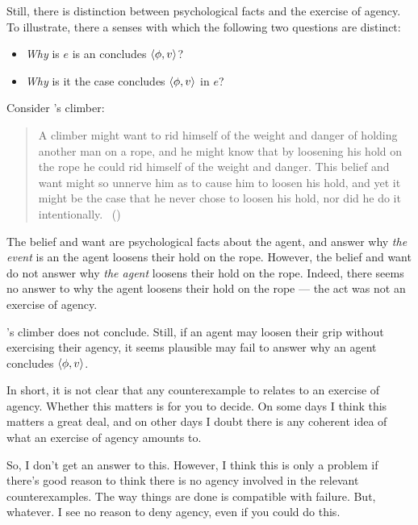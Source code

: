 \begin{note}
  Still, there is distinction between psychological facts and the exercise of agency.
  To illustrate, there a senses with which the following two questions are distinct:

  \begin{itemize}
  \item
    \emph{Why} is \(e\) is an  \vAgent{} concludes \(\langle\phi, v\rangle\)?
  \item
    \emph{Why} is it the case \vAgent{} concludes \(\langle\phi, v\rangle\) in \(e\)?
  \end{itemize}
  Consider \citeauthor{Davidson:1973vd}'s climber:
  \begin{quote}
    A climber might want to rid himself of the weight and danger of holding another man on a rope, and he might know that by loosening his hold on the rope he could rid himself of the weight and danger.
    This belief and want might so unnerve him as to cause him to loosen his hold, and yet it might be the case that he never chose to loosen his hold, nor did he do it intentionally.%
    \mbox{ }\hfill\mbox{(\citeyear[79]{Davidson:1973vd})}
  \end{quote}
  The \agents{} belief and want are psychological facts about the agent, and answer why \emph{the event} is an  the agent loosens their hold on the rope.
  However, the \agents{} belief and want do not answer why \emph{the agent} loosens their hold on the rope.
  Indeed, there seems no answer to why the agent loosens their hold on the rope --- the act was not an exercise of agency.

  \citeauthor{Davidson:1973vd}'s climber does not conclude.
  Still, if an agent may loosen their grip without exercising their agency, it seems plausible  may fail to answer why  an agent concludes \(\langle\phi, v\rangle\).

  In short, it is not clear that any counterexample to \issueInclusion{} relates to an exercise of agency.
  Whether this matters is for you to decide.
  On some days I think this matters a great deal, and on other days I doubt there is any coherent idea of what an exercise of agency amounts to.
\end{note}


\begin{note}
  \color{red}
  So, I don't get an answer to this.
  However, I think this is only a problem if there's good reason to think there is no agency involved in the relevant counterexamples.
  The way things are done is compatible with failure.
  But, whatever.
  I see no reason to deny agency, even if you could do this.
\end{note}


